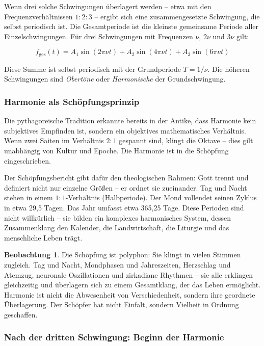 ﻿\documentclass[a4paper,12pt]{article}
\theoremstyle{definition}
\newtheorem{observation}{Beobachtung}[section]
\begin{document}
Wenn drei solche Schwingungen überlagert werden -- etwa mit den Frequenzverhältnissen
$1 : 2 : 3$ -- ergibt sich eine zusammengesetzte Schwingung, die selbst periodisch
ist. Die Gesamtperiode ist die kleinste gemeinsame Periode aller Einzelschwingungen.
Für drei Schwingungen mit Frequenzen $\nu$, $2\nu$ und $3\nu$ gilt:

\begin{equation}
	f_{\text{ges}}(t) = A_1 \sin(2\pi\nu t) + A_2 \sin(4\pi\nu t) + A_3 \sin(6\pi\nu t)
\end{equation}

Diese Summe ist selbst periodisch mit der Grundperiode $T = 1/\nu$. Die höheren
Schwingungen sind \textit{Obertöne} oder \textit{Harmonische} der Grundschwingung.

\subsubsection{Harmonie als Schöpfungsprinzip}

Die pythagoreische Tradition erkannte bereits in der Antike, dass Harmonie kein
subjektives Empfinden ist, sondern ein objektives mathematisches Verhältnis. Wenn
zwei Saiten im Verhältnis $2:1$ gespannt sind, klingt die Oktave -- dies gilt
unabhängig von Kultur und Epoche. Die Harmonie ist in die Schöpfung eingeschrieben.

Der Schöpfungsbericht gibt dafür den theologischen Rahmen: Gott trennt und
definiert nicht nur einzelne Größen -- er ordnet sie zueinander. Tag und Nacht
stehen in einem $1:1$-Verhältnis (Halbperiode). Der Mond vollendet seinen Zyklus
in etwa 29,5 Tagen. Das Jahr umfasst etwa 365,25 Tage. Diese Perioden sind nicht
willkürlich -- sie bilden ein komplexes harmonisches System, dessen Zusammenklang
den Kalender, die Landwirtschaft, die Liturgie und das menschliche Leben trägt.

\begin{observation}
	Die Schöpfung ist polyphon: Sie klingt in vielen Stimmen zugleich. Tag und Nacht,
	Mondphasen und Jahreszeiten, Herzschlag und Atemzug, neuronale Oszillationen
	und zirkadiane Rhythmen -- sie alle erklingen gleichzeitig und überlagern sich
	zu einem Gesamtklang, der das Leben ermöglicht. Harmonie ist nicht die Abwesenheit
	von Verschiedenheit, sondern ihre geordnete Überlagerung. Der Schöpfer hat nicht
	Einfalt, sondern Vielheit in Ordnung geschaffen.
\end{observation}

\subsubsection{Nach der dritten Schwingung: Beginn der Harmonie}
\end{document}
